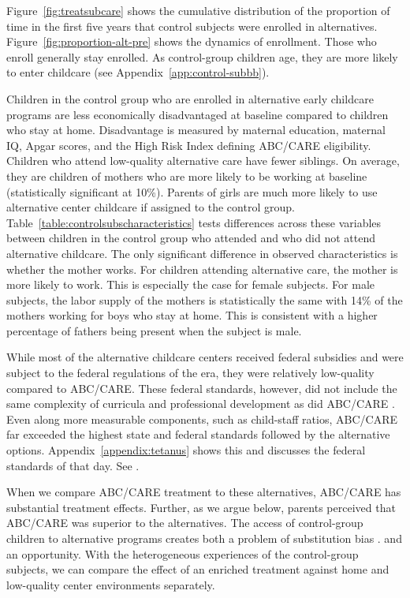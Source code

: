 Figure~\ref{fig:treatsubcare} shows the cumulative distribution of the proportion of time in the first five years that control subjects were enrolled in alternatives. Figure~\ref{fig:proportion-alt-pre} shows the dynamics of enrollment. Those who enroll generally stay enrolled. As control-group children age, they are more likely to enter childcare (see Appendix~\ref{app:control-subbb}).

Children in the control group who are enrolled in alternative early childcare programs are less economically disadvantaged at baseline compared to children who stay at home. Disadvantage is measured by maternal education, maternal IQ, Apgar scores, and the High Risk Index defining ABC/CARE eligibility. Children who attend low-quality alternative care have fewer siblings. On average, they are children of mothers who are more likely to be working at baseline (statistically significant at 10\%). Parents of girls are much more likely to use alternative center childcare if assigned to the control group. Table~\ref{table:controlsubscharacteristics} tests differences across these variables between children in the control group who attended and who did not attend alternative childcare. The only significant difference in observed characteristics is whether the mother works. For children attending alternative care, the mother is more likely to work. This is especially the case for female subjects. For male subjects, the labor supply of the mothers is statistically the same with 14\% of the mothers working for boys who stay at home. This is consistent with a higher percentage of fathers being present when the subject is male.

While most of the alternative childcare centers received federal subsidies and were subject to the federal regulations of the era, they were relatively low-quality compared to ABC/CARE. These federal standards, however, did not include the same complexity of curricula and professional development as did ABC/CARE \citep{Burchinal_etal_1989_CD_Daycare-Pre-K-Dev}. Even along more measurable components, such as child-staff ratios, ABC/CARE far exceeded the highest state and federal standards followed by the alternative options. Appendix~\ref{appendix:tetanus} shows this and discusses the federal standards of that day. See \citet{Department-of-Health_1968_DayCareRequirements,NCGA_1971_House-Bill-100,Ramey-et-al_1977_Intro-to-ABC,Ramey_Campbell_1979_SR,Ramey_McGinness_etal_1982_Abecedarianapproach, Burchinal_Campbell_etal_1997_CD}.


When we compare ABC/CARE treatment to these alternatives, ABC/CARE has substantial treatment effects. Further, as we argue below, parents perceived that ABC/CARE was superior to the alternatives. The access of control-group children to alternative programs creates both a problem of substitution bias \citep{Heckman_1992_randomization,Heckman_Hohmann_etal_2000_QJE, Kline_Walters_2016_QJE}. and an opportunity. With the heterogeneous experiences of the control-group subjects, we can compare the effect of an enriched treatment against home and low-quality center environments separately.



